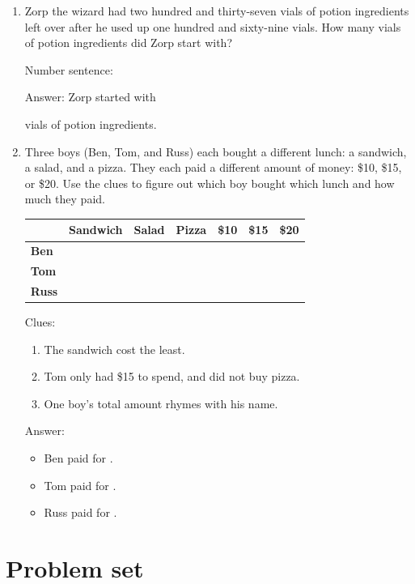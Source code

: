 \documentclass{tufte-book}
\providecommand{\tabularnewline}{\\}
\begin{document}
\begin{enumerate}
\item Zorp the wizard had two hundred and thirty-seven vials of potion ingredients left over
after he used up one hundred and sixty-nine vials.
How many vials of potion ingredients did Zorp start with?\bigskip\par
Number sentence: \dotfill\bigskip\par
Answer: Zorp started with \dotfill\bigskip\par\dotfill\bigskip\par\dotfill\bigskip\par\dotfill\bigskip
vials of potion ingredients.

\item Three boys (Ben, Tom, and Russ) each bought a different lunch: a sandwich, a salad, and a pizza.
They each paid a different amount of money: \$10, \$15, or \$20. 
Use the clues to figure out which boy bought which lunch and how much they paid.

\begin{tabular}{|l|>{\centering}p{2cm}|>{\centering}p{2cm}|>{\centering}p{2cm}|>{\centering}p{2cm}|>{\centering}p{2cm}|>{\centering}p{2cm}|}
\hline 
  & \textbf{Sandwich} & \textbf{Salad} & \textbf{Pizza} & \textbf{\$10} & \textbf{\$15} & \textbf{\$20}\tabularnewline
\hline 
\hline 
\textbf{Ben} &  &  &  &  &  & \tabularnewline
\hline 
\textbf{Tom} &  &  &  &  &  & \tabularnewline
\hline 
\textbf{Russ} &  &  &  &  &  & \tabularnewline
\hline 
\end{tabular}

Clues:
\begin{enumerate}
\item The sandwich cost the least.
\item Tom only had \$15 to spend, and did not buy pizza.
\item One boy's total amount rhymes with his name.
\end{enumerate}

Answer:\bigskip
\begin{itemize}
\item Ben paid \dotfill\bigskip for \dotfill\bigskip.
\item Tom paid \dotfill\bigskip for \dotfill\bigskip.
\item Russ paid \dotfill\bigskip for \dotfill\bigskip.
\end{itemize}

\end{enumerate}

\clearpage\section{Problem set }
\end{document}
